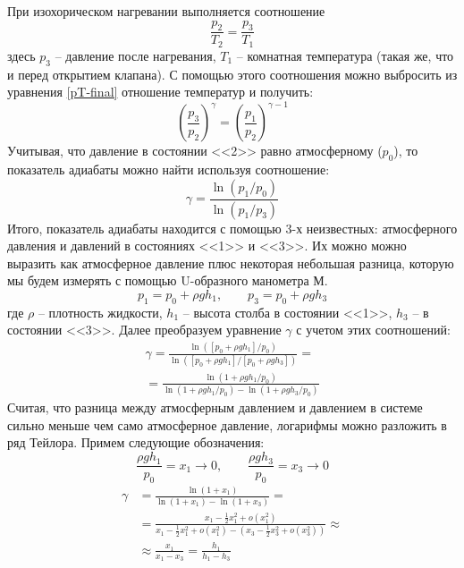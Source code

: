 \documentclass[a4paper,12pt]{report}
\begin{document}
\begin{multicols}{2}
        При изохорическом нагревании выполняется соотношение
        \begin{equation}
            \frac{p_2}{T_2}=\frac{p_3}{T_1}   
        \end{equation}
        здесь $p_3$ -- давление после нагревания, $T_1$ -- комнатная температура (такая же, что и перед открытием клапана). С помощью этого соотношения можно выбросить из уравнения \eqref{pT-final} отношение температур и получить:
        \begin{equation}
            \label{P-final}
            \left(\frac{p_3}{p_2}\right)^\gamma = \left(\frac{p_1}{p_2}\right)^{\gamma-1}
        \end{equation}
        Учитывая, что давление в состоянии <<2>> равно атмосферному ($p_0$), то показатель адиабаты можно найти используя соотношение:
        \begin{equation}
            \label{gamma}
            \gamma = \frac{\ln(p_1/p_0)}{\ln(p_1/p_3)}
        \end{equation}
        Итого, показатель адиабаты находится с помощью 3-х неизвестных: атмосферного давления и давлений в состояниях <<1>> и <<3>>. Их можно можно выразить как атмосферное давление плюс некоторая небольшая разница, которую мы будем измерять с помощью U-образного манометра М.
        \begin{equation*}
            p_1=p_0+\rho gh_1, \qquad p_3=p_0+\rho gh_3
        \end{equation*}
        где $\rho$ -- плотность жидкости, $h_1$ -- высота столба в состоянии <<1>>, $h_3$ -- в состоянии <<3>>. Далее преобразуем уравнение $\gamma$ с учетом этих соотношений:
        \begin{gather*}
            \gamma=\frac{\ln([p_0+\rho gh_1]/p_0)}{\ln([p_0+\rho gh_1]/[p_0+\rho gh_3])}=\\=\frac{\ln(1+\rho gh_1/p_0)}{\ln (1+\rho gh_1/p_0)-\ln(1+\rho gh_3/p_0)} 
        \end{gather*}
        Считая, что разница между атмосферным давлением и давлением в системе сильно меньше чем само атмосферное давление, логарифмы можно разложить в ряд Тейлора. Примем следующие обозначения:
        \begin{equation*}
            \frac{\rho gh_1}{p_0}=x_1\rightarrow0, \qquad \frac{\rho g h_3}{p_0}=x_3\rightarrow 0
        \end{equation*}
        \begin{align}
            \nonumber \gamma&=\frac{\ln(1+x_1)}{\ln(1+x_1)-\ln(1+x_3)}=\\
            \nonumber&=\frac{x_1-\frac{1}{2}x_1^2+o(x_1^2)}{x_1-\frac{1}{2}x_1^2+o(x_1^2)-(x_3-\frac{1}{2}x_3^2+o(x_3^2))}\approx\\ 
            &\approx \frac{x_1}{x_1-x_3}=\frac{h_1}{h_1-h_3} \label{final gamma via h}
        \end{align}

\end{multicols}
\end{document}

